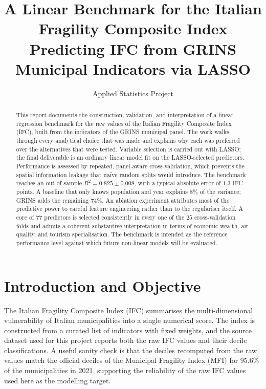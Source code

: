 \documentclass[11pt,a4paper]{article}
\title{A Linear Benchmark for the Italian Fragility Composite Index\\[0.3em]
  \large Predicting IFC from GRINS Municipal Indicators via LASSO}
\author{Applied Statistics Project}
\date{}
\begin{document}
\maketitle

\begin{abstract}
\noindent
This report documents the construction, validation, and interpretation
of a linear regression benchmark for the raw values of the Italian
Fragility Composite Index (IFC), built from the indicators of the GRINS
municipal panel. The work walks through every analytical choice that
was made and explains why each was preferred over the alternatives that
were tested. Variable selection is carried out with LASSO; the final
deliverable is an ordinary linear model fit on the LASSO-selected
predictors. Performance is assessed by repeated, panel-aware
cross-validation, which prevents the spatial information leakage that
naïve random splits would introduce. The benchmark reaches an
out-of-sample \(R^{2} = 0.825 \pm 0.008\), with a typical absolute
error of \(1.3\) IFC points. A baseline that only knows population and
year explains \(8\%\) of the variance; GRINS adds the remaining
\(74\%\). An ablation experiment attributes most of the predictive
power to careful feature engineering rather than to the regulariser
itself. A core of \(77\) predictors is selected consistently in every
one of the \(25\) cross-validation folds and admits a coherent
substantive interpretation in terms of economic wealth, air quality,
and tourism specialisation. The benchmark is intended as the reference
performance level against which future non-linear models will be
evaluated.
\end{abstract}

\tableofcontents
\vspace{1em}

\section{Introduction and Objective}
\label{sec:intro}

The Italian Fragility Composite Index (IFC) summarises the
multi-dimensional vulnerability of Italian municipalities into a single
numerical score. The index is constructed from a curated list of
indicators with fixed weights, and the source dataset used for this
project reports both the raw IFC values and their decile
classifications. A useful sanity check is that the deciles recomputed
from the raw values match the official deciles of the Municipal
Fragility Index (MFI) for \(95.6\%\) of the municipalities in 2021,
supporting the reliability of the raw IFC values used here as the
modelling target.
\end{document}

